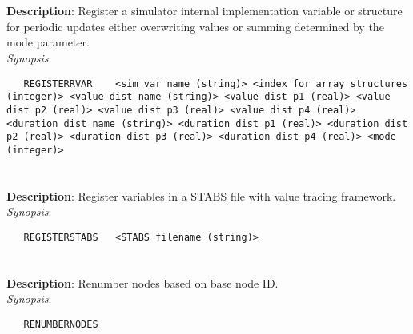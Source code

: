 \section{\quad{}}
\label{manpages:REGISTERRVAR}
\label{manpages:registerrvar}
\vspace{-0.1in}
{\bf Description}: 	Register a simulator internal implementation variable or structure for periodic updates either overwriting values or summing determined by the mode parameter.\\[1.5ex]
{\em Synopsis}:
\vspace{-0.05in}
\scriptsize
\begin{lstlisting}
   REGISTERRVAR    <sim var name (string)> <index for array structures (integer)> <value dist name (string)> <value dist p1 (real)> <value dist p2 (real)> <value dist p3 (real)> <value dist p4 (real)> <duration dist name (string)> <duration dist p1 (real)> <duration dist p2 (real)> <duration dist p3 (real)> <duration dist p4 (real)> <mode (integer)>	
\end{lstlisting}
\normalsize
\vspace{-0.05in}


\section{\quad{}}
\label{manpages:REGISTERSTABS}
\label{manpages:registerstabs}
\vspace{-0.1in}
{\bf Description}: 	Register variables in a STABS file with value tracing framework.\\[1.5ex]
{\em Synopsis}:
\vspace{-0.05in}
\scriptsize
\begin{lstlisting}
   REGISTERSTABS   <STABS filename (string)>														
\end{lstlisting}
\normalsize
\vspace{-0.05in}


\section{\quad{}}
\label{manpages:RENUMBERNODES}
\label{manpages:renumbernodes}
\vspace{-0.1in}
{\bf Description}: 	Renumber nodes based on base node ID.\\[1.5ex]
{\em Synopsis}:
\vspace{-0.05in}
\scriptsize
\begin{lstlisting}
   RENUMBERNODES   																				
\end{lstlisting}
\normalsize
\vspace{-0.05in}


